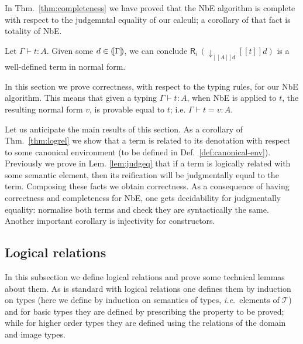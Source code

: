 \documentclass{LMCS}
\theoremstyle{plain}\newtheorem{satz}[thm]{Satz}
\def\ie{{\em i.e.}}
\newcommand{\LONGVERSION}[1]{#1}
\newcommand{\SHORTVERSION}[1]{}
\newcommand{\dterm}[3]{#1\vdash#3:#2}
\newcommand{\deqterm}[4]{#1\vdash#3=#4:#2}
\newcommand{\da}[2]{\mathop{\downarrow}\nolimits_{#1}{#2}}
\newcommand{\reify}[2]{\mathsf{R}_{#1}\,#2}
\newcommand{\perT}{\mathcal{T}}
\newcommand{\semc}[1]{[\![#1]\!]}
\newcommand{\LONGVERSION}[1]{}
\newcommand{\SHORTVERSION}[1]{#1}
\newcommand{\LONGSHORT}[2]{\LONGVERSION{#1}\SHORTVERSION{#2}}
\begin{document}
\LONGSHORT{

  \noindent In Thm.~\ref{thm:completeness} we have proved that the NbE algorithm
  is complete with respect to the judgemntal equality of our calculi;
  a corollary of that fact is totality of NbE.

  \begin{rem} Let $\dterm{\Gamma}{A}{t}$. Given some $d \in
    (\![{\Gamma}]\!)$, we can conclude
    $\reify{i}{(\da{\semc{A}d}{\semc{t}d})}$ is a well-defined term 
    in normal form.
  \end{rem}

  In this section we prove correctness, with respect to the typing
  rules, for our NbE algorithm. This means that given a typing
  $\dterm{\Gamma}{A}{t}$, when NbE is applied to $t$, the resulting
  normal form $v$, is provable equal to $t$; i.e.
  $\deqterm{\Gamma}{A}{t}{v}$.

  Let us anticipate the main results of this section. As a corollary of
  Thm.~\ref{thm:logrel} we show that a term is related to its
  denotation with respect to some canonical environment (to be defined
  in Def.~\ref{def:canonical-env}). Previously we prove in Lem.
  \ref{lem:judgeq} that if a term is logically related with some
  semantic element, then its reification will be judgmentally equal
  to the term. Composing these facts we obtain correctness. As a
  consequence of having correctness and completeness for NbE, one gets
  decidability for judgmentally equality: normalise both terms and
  check they are syntactically the same. Another important corollary
  is injectivity for constructors.

  \subsection{Logical relations}
  \label{sec:logrel-sing}
  In this subsection we define logical relations and prove some
  technical lemmas about them. As is standard with logical relations
  one defines them by induction on types (here we define by induction
  on semantics of types, \ie\  elements of $\perT$) and for basic types
  they are defined by prescribing the property to be proved; while for
  higher order types they are defined using the relations of the 
  domain and image types.

}{ 

  In order to prove soundness of our normalisation algorithm we
  define logical relations \cite{kripke-models} between types and
  elements in the domain of $\perT$, and between terms and elements in
  the domain of the PER corresponding to elements of $\perT$.

}
\end{document}
